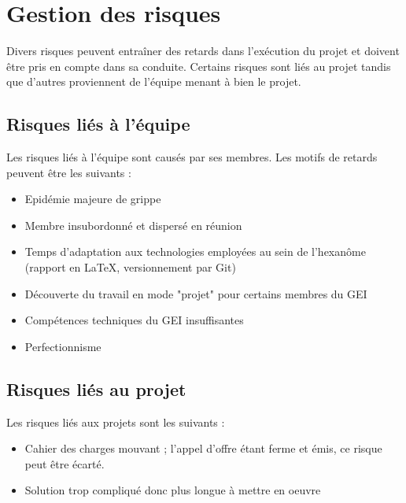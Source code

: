 \section{Gestion des risques}

Divers risques peuvent entraîner des retards dans l'exécution du projet et
doivent être pris en compte dans sa conduite. Certains risques sont liés au
projet tandis que d'autres proviennent de l'équipe menant à bien le projet.

\subsection{Risques liés à l'équipe}

Les risques liés à l'équipe sont causés par ses membres. Les motifs de
retards peuvent être les suivants :

\begin{itemize}

\item Epidémie majeure de grippe
\item Membre insubordonné et dispersé en réunion
\item Temps d'adaptation aux technologies employées au sein de l'hexanôme
(rapport en \LaTeX, versionnement par Git)
\item Découverte du travail en mode "projet" pour certains membres du GEI
\item Compétences techniques du GEI insuffisantes
\item Perfectionnisme

\end{itemize}


\subsection{Risques liés au projet}

Les risques liés aux projets sont les suivants :

\begin{itemize}

\item Cahier des charges mouvant ; l'appel d'offre étant ferme et émis, ce
risque peut être écarté.
\item Solution trop compliqué donc plus longue à mettre en oeuvre

\end{itemize}

\vfill
\pagebreak

